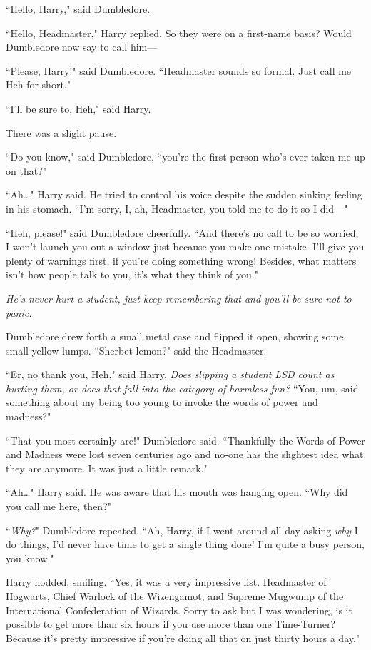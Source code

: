 ``Hello, Harry," said Dumbledore.

``Hello, Headmaster," Harry replied. So they were on a first-name basis? Would Dumbledore now say to call him—

``Please, Harry!" said Dumbledore. ``Headmaster sounds so formal. Just call me Heh for short."

``I'll be sure to, Heh," said Harry.

There was a slight pause.

``Do you know," said Dumbledore, ``you're the first person who's ever taken me up on that?"

``Ah{\ldots}" Harry said. He tried to control his voice despite the sudden sinking feeling in his stomach. ``I'm sorry, I, ah, Headmaster, you told me to do it so I did—"

``Heh, please!" said Dumbledore cheerfully. ``And there's no call to be so worried, I won't launch you out a window just because you make one mistake. I'll give you plenty of warnings first, if you're doing something wrong! Besides, what matters isn't how people talk to you, it's what they think of you."

\emph{He's never hurt a student, just keep remembering that and you'll be sure not to panic.}

Dumbledore drew forth a small metal case and flipped it open, showing some small yellow lumps. ``Sherbet lemon?" said the Headmaster.

``Er, no thank you, Heh," said Harry. \emph{Does slipping a student LSD count as hurting them, or does that fall into the category of harmless fun?} ``You, um, said something about my being too young to invoke the words of power and madness?"

``That you most certainly are!" Dumbledore said. ``Thankfully the Words of Power and Madness were lost seven centuries ago and no-one has the slightest idea what they are anymore. It was just a little remark."

``Ah{\ldots}" Harry said. He was aware that his mouth was hanging open. ``Why did you call me here, then?"

``\emph{Why?}" Dumbledore repeated. ``Ah, Harry, if I went around all day asking \emph{why} I do things, I'd never have time to get a single thing done! I'm quite a busy person, you know."

Harry nodded, smiling. ``Yes, it was a very impressive list. Headmaster of Hogwarts, Chief Warlock of the Wizengamot, and Supreme Mugwump of the International Confederation of Wizards. Sorry to ask but I was wondering, is it possible to get more than six hours if you use more than one Time-Turner? Because it's pretty impressive if you're doing all that on just thirty hours a day."

